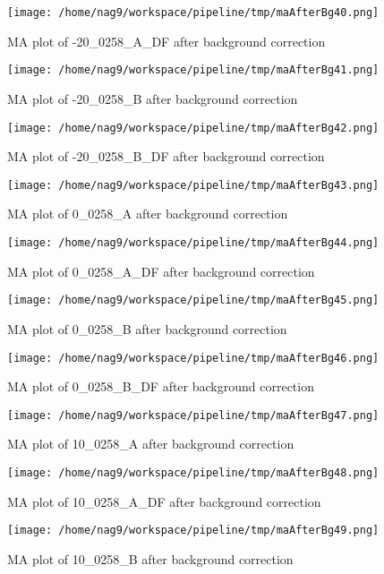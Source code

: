 \documentclass[titlepage]{article}
\begin{document}
\begin{figure}[htb!]
\centering
\texttt{[image: /home/nag9/workspace/pipeline/tmp/maAfterBg40.png]}
\caption{MA plot of -20\_0258\_A\_DF after background correction}
\end{figure}\pagebreak
\begin{figure}[htb!]
\centering
\texttt{[image: /home/nag9/workspace/pipeline/tmp/maAfterBg41.png]}
\caption{MA plot of -20\_0258\_B after background correction}
\end{figure}\pagebreak
\begin{figure}[htb!]
\centering
\texttt{[image: /home/nag9/workspace/pipeline/tmp/maAfterBg42.png]}
\caption{MA plot of -20\_0258\_B\_DF after background correction}
\end{figure}\pagebreak
\begin{figure}[htb!]
\centering
\texttt{[image: /home/nag9/workspace/pipeline/tmp/maAfterBg43.png]}
\caption{MA plot of 0\_0258\_A after background correction}
\end{figure}\pagebreak
\begin{figure}[htb!]
\centering
\texttt{[image: /home/nag9/workspace/pipeline/tmp/maAfterBg44.png]}
\caption{MA plot of 0\_0258\_A\_DF after background correction}
\end{figure}\pagebreak
\begin{figure}[htb!]
\centering
\texttt{[image: /home/nag9/workspace/pipeline/tmp/maAfterBg45.png]}
\caption{MA plot of 0\_0258\_B after background correction}
\end{figure}\pagebreak
\begin{figure}[htb!]
\centering
\texttt{[image: /home/nag9/workspace/pipeline/tmp/maAfterBg46.png]}
\caption{MA plot of 0\_0258\_B\_DF after background correction}
\end{figure}\pagebreak
\begin{figure}[htb!]
\centering
\texttt{[image: /home/nag9/workspace/pipeline/tmp/maAfterBg47.png]}
\caption{MA plot of 10\_0258\_A after background correction}
\end{figure}\pagebreak
\begin{figure}[htb!]
\centering
\texttt{[image: /home/nag9/workspace/pipeline/tmp/maAfterBg48.png]}
\caption{MA plot of 10\_0258\_A\_DF after background correction}
\end{figure}\pagebreak
\begin{figure}[htb!]
\centering
\texttt{[image: /home/nag9/workspace/pipeline/tmp/maAfterBg49.png]}
\caption{MA plot of 10\_0258\_B after background correction}
\end{figure}\pagebreak
\end{document}
